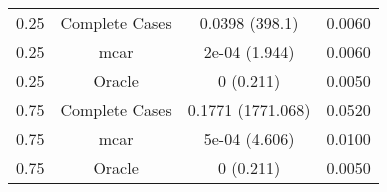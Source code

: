 \begin{table}[ht]
\centering
\begin{tabular}{cccc}
  \hline
  \hline
0.25 & Complete Cases & 0.0398 (398.1) & 0.0060 \\ 
  0.25 & mcar & 2e-04 (1.944) & 0.0060 \\ 
  0.25 & Oracle & 0 (0.211) & 0.0050 \\ 
  0.75 & Complete Cases & 0.1771 (1771.068) & 0.0520 \\ 
  0.75 & mcar & 5e-04 (4.606) & 0.0100 \\ 
  0.75 & Oracle & 0 (0.211) & 0.0050 \\ 
   \hline
\end{tabular}
\end{table}
